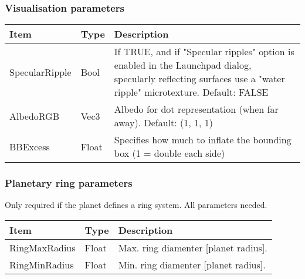 \documentclass[Orbiter Developer Manual.tex]{subfiles}
\begin{document}
\subsubsection*{Visualisation parameters}
	\begin{longtable}{ |p{}|p{}|p{}| }
	\hline\rule{0pt}{2ex}
	\textbf{Item} & \textbf{Type} & \textbf{Description}\\
	\hline\rule{0pt}{2ex}
	SpecularRipple & Bool & If TRUE, and if "Specular ripples" option is enabled in the Launchpad dialog, specularly reflecting surfaces use a "water ripple" microtexture. Default: FALSE\\
	\hline\rule{0pt}{2ex}
	AlbedoRGB & Vec3 & Albedo for dot representation (when far away). Default: (1, 1, 1)\\
	\hline\rule{0pt}{2ex}
	BBExcess & Float & Specifies how much to inflate the bounding box (1 = double each side)\\
	\hline
	\end{longtable}


\subsubsection*{Planetary ring parameters}
Only required if the planet defines a ring system. All parameters needed.

	\begin{longtable}{ |p{}|p{}|p{}| }
	\hline\rule{0pt}{2ex}
	\textbf{Item} & \textbf{Type} & \textbf{Description}\\
	\hline\rule{0pt}{2ex}
	RingMaxRadius & Float & Max. ring diamenter [planet radius].\\
	\hline\rule{0pt}{2ex}
	RingMinRadius & Float & Min. ring diamenter [planet radius].\\
	\hline
	\end{longtable}
\end{document}

